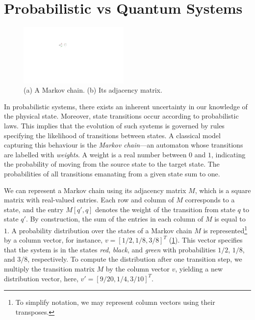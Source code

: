 \section{Probabilistic vs Quantum Systems}

\begin{figure}
\includegraphics[width=0.48\textwidth]{Figures/MChains/Mchain} 
\caption{(a) A Markov chain. (b) Its adjacency matrix.}
\label{MChain:fig}
\end{figure}

In probabilistic systems, there exists an inherent uncertainty in our knowledge of the physical state.  
%
Moreover, state transitions occur according to probabilistic laws.  
%
This implies that the evolution of such systems is governed by rules specifying the likelihood of transitions between states.  
%
A classical model capturing this behaviour is the \emph{Markov chain}—an automaton whose transitions are labelled with \emph{weights}.  
%
A weight is a real number between $0$ and $1$, indicating the probability of moving from the source state to the target state.  
%
The probabilities of all transitions emanating from a given state sum to one.  

We can represent a Markov chain using its adjacency matrix $M$, which is a square matrix with real-valued entries.  
%
Each row and column of $M$ corresponds to a state, and the entry $M[q', q]$ denotes the weight of the transition from state $q$ to state $q'$.  
%
By construction, the sum of the entries in each column of $M$ is equal to $1$.
%
A probability distribution over the states of a Markov chain $M$ is represented\footnote{To simplify notation, we may represent column vectors using their transposes.}  
 by a column vector, for instance, $v = [1/2, 1/8, 3/8]^T$ (\cref{MChain:fig}).
%
%
This vector specifies that the system is in the states \emph{red}, \emph{black}, and \emph{green} with probabilities $1/2$, $1/8$, and $3/8$, respectively.  
%
To compute the distribution after one transition step, we multiply the transition matrix $M$ by the column vector $v$, yielding a new distribution vector, here, $v' = [9/20, 1/4, 3/10]^T$.


